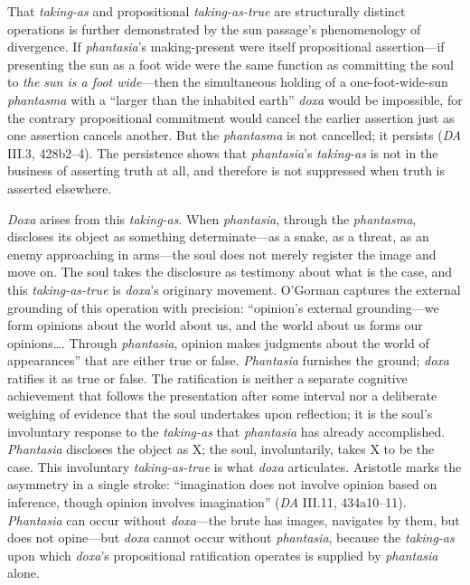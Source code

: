 \documentclass{article}
\begin{document}
That \textit{taking-as} and propositional \textit{taking-as-true} are structurally distinct operations is further demonstrated by the sun passage's phenomenology of divergence. If \textit{phantasia}'s making-present were itself propositional assertion---if presenting the sun as a foot wide were the same function as committing the soul to \textit{the sun is a foot wide}---then the simultaneous holding of a one-foot-wide-sun \textit{phantasma} with a ``larger than the inhabited earth'' \textit{doxa} would be impossible, for the contrary propositional commitment would cancel the earlier assertion just as one assertion cancels another. But the \textit{phantasma} is not cancelled; it persists (\textit{DA} III.3, 428b2--4). The persistence shows that \textit{phantasia}'s \textit{taking-as} is not in the business of asserting truth at all, and therefore is not suppressed when truth is asserted elsewhere.


\textit{Doxa} arises from this \textit{taking-as}. When \textit{phantasia}, through the \textit{phantasma}, discloses its object as something determinate---as a snake, as a threat, as an enemy approaching in arms---the soul does not merely register the image and move on. The soul takes the disclosure as testimony about what is the case, and this \textit{taking-as-true} is \textit{doxa}'s originary movement. O'Gorman captures the external grounding of this operation with precision: ``opinion's external grounding---we form opinions about the world about us, and the world about us forms our opinions\ldots. Through \textit{phantasia}, opinion makes judgments about the world of appearances'' \autocite[25]{ogorman_aristotles_phantasia} that are either true or false. \textit{Phantasia} furnishes the ground; \textit{doxa} ratifies it as true or false. The ratification is neither a separate cognitive achievement that follows the presentation after some interval nor a deliberate weighing of evidence that the soul undertakes upon reflection; it is the soul's involuntary response to the \textit{taking-as} that \textit{phantasia} has already accomplished. \textit{Phantasia} discloses the object as X; the soul, involuntarily, takes X to be the case. This involuntary \textit{taking-as-true} is what \textit{doxa} articulates. Aristotle marks the asymmetry in a single stroke: ``imagination does not involve opinion based on inference, though opinion involves imagination'' (\textit{DA} III.11, 434a10--11). \textit{Phantasia} can occur without \textit{doxa}---the brute has images, navigates by them, but does not opine---but \textit{doxa} cannot occur without \textit{phantasia}, because the \textit{taking-as} upon which \textit{doxa}'s propositional ratification operates is supplied by \textit{phantasia} alone.
\end{document}
